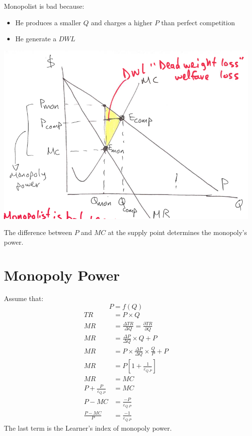 \documentclass[../ECON-281-Notes.tex]{subfiles}
\begin{document}
Monopolist is bad because:
\begin{itemize}
    \item He produces a smaller \(Q\) and charges a higher \(P\) than perfect competition
    \item He generate a \(DWL\)
\end{itemize}

\includegraphics[width=\columnwidth]{assets/image_2021-11-23-12-13-29.png}

The difference between \(P\) and \(MC\) at the supply point determines the monopoly's power.
\newpage
\section{Monopoly Power}
Assume that: \[
    P = f(Q)
\]
\begin{align*}
    TR &= P \times Q\\
    MR &= \frac{\Delta TR}{\Delta Q} = \frac{\partial TR}{\partial Q}\\
    MR &= \frac{\Delta P}{\Delta Q} \times Q + P \\
    MR &= P \times \frac{\Delta P}{\Delta Q} \times \frac{Q}{P} + P \\
    MR &= P[1 + \frac{1}{\varepsilon_{Q.P}}]\\
    MR &= MC \\
    P + \frac{P}{\varepsilon_{Q.P}} &= MC\\
    P - MC &= \frac{-P}{\varepsilon_{Q.P}}\\
    \frac{P - MC}{P} &= \frac{-1}{\varepsilon_{Q.P}}
\end{align*}
The last term is the Learner's index of monopoly power.
\end{document}
